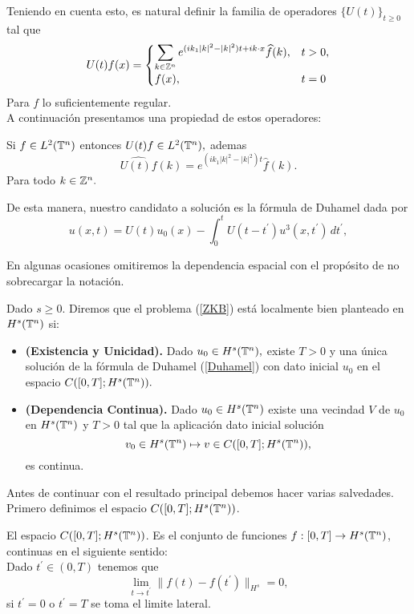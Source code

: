 Teniendo en cuenta esto, es natural definir la familia de operadores $\{U(t)\}_{t\geq 0}$ tal que
$$U(t)f(x)=\begin{cases}
    \displaystyle\sum_{k\in\mathbb{Z}^n}e^{(ik_1|k|^2-|k|^2)t+ik\cdot x}\widehat{f}(k), & t>0,\\
    f(x), &t=0
\end{cases}$$
Para $f$ lo suficientemente regular.\\
 A continuación presentamos una propiedad de estos operadores:
\begin{prop}\label{FourierUt}
    Si $f\in L^2(\mathbb{T}^n)$ entonces $U(t)f\in L^2(\mathbb{T}^n),$ ademas
    $$\hat{U(t)f}(k)=e^{(ik_1|k|^2-|k|^2)t}\hat{f}(k).$$
    Para todo $k\in \mathbb{Z}^n.$ 
 \end{prop} 


De esta manera, nuestro candidato a solución es la fórmula de Duhamel dada por
\begin{equation}\label{Duhamel}
u(x,t)=U(t)u_0(x)-\int_0^tU(t-t^\prime)u^3(x,t^\prime)\,dt^\prime,
\end{equation}
\begin{note}
En algunas ocasiones omitiremos la dependencia espacial con el propósito de no sobrecargar la notación.
\end{note}
\begin{definition}
    Dado $s\geq 0.$ Diremos que el problema (\ref{ZKB}) está localmente bien planteado en $H^s(\mathbb{T}^n)$ si:
    \begin{itemize}
        \item \textbf{(Existencia y Unicidad).} Dado $u_0\in H^s(\mathbb{T}^n),$ existe $T>0$ y una única solución de la fórmula de Duhamel (\ref{Duhamel}) con dato inicial $u_0$ en el espacio $C([0,T];H^s(\mathbb{T}^n)).$
        \item \textbf{(Dependencia Continua).} Dado $u_0\in H^s(\mathbb{T}^n)$ existe una vecindad $V$ de $u_0$ en $H^s(\mathbb{T}^n)$ y $T>0$ tal que la aplicación dato inicial solución 
        $$v_0\in H^s(\mathbb{T}^n)\mapsto v\in C([0,T];H^s(\mathbb{T}^n)), $$ 
        es continua.
    \end{itemize}
\end{definition}
Antes de continuar con el resultado principal debemos hacer varias salvedades. Primero definimos el espacio $C([0,T];H^s(\mathbb{T}^n))$.
\begin{definition}
     El espacio $C([0,T];H^s(\mathbb{T}^n))$. Es el conjunto de funciones $f:[0,T]\to H^s(\mathbb{T}^n)$, continuas en el siguiente sentido:\\ 
 Dado $t^\prime\in(0,T)$ tenemos que
$$\lim_{t\to t^\prime}\|f(t)-f(t^\prime)\|_{H^s}=0,$$
si $t^\prime=0$ o $t^\prime=T$ se toma el limite lateral.
 \end{definition}
